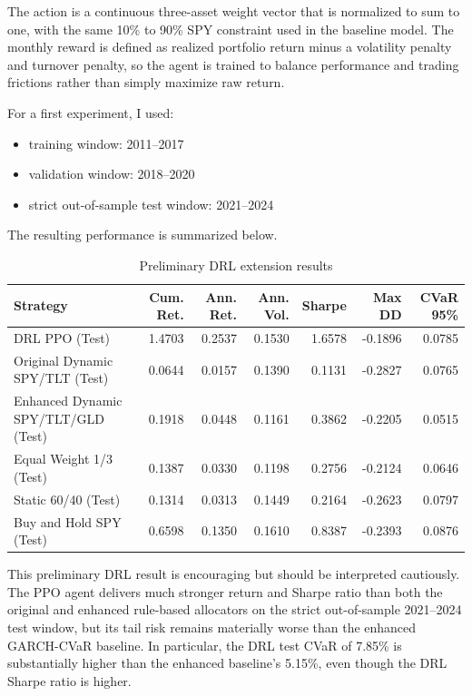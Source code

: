 \documentclass[11pt]{article}
\begin{document}
The action is a continuous three-asset weight vector that is normalized to sum to one, with the same 10\% to 90\% SPY constraint used in the baseline model. The monthly reward is defined as realized portfolio return minus a volatility penalty and turnover penalty, so the agent is trained to balance performance and trading frictions rather than simply maximize raw return.

For a first experiment, I used:
\begin{itemize}
    \item training window: 2011--2017
    \item validation window: 2018--2020
    \item strict out-of-sample test window: 2021--2024
\end{itemize}

The resulting performance is summarized below.

\begin{table}[H]
\centering
\caption{Preliminary DRL extension results}
\small
\begin{tabular}{>{\raggedright\arraybackslash}p{4.6cm}rrrrrr}
\toprule
Strategy & Cum. Ret. & Ann. Ret. & Ann. Vol. & Sharpe & Max DD & CVaR 95\% \\
\midrule
DRL PPO (Test) & 1.4703 & 0.2537 & 0.1530 & 1.6578 & -0.1896 & 0.0785 \\
Original Dynamic SPY/TLT (Test) & 0.0644 & 0.0157 & 0.1390 & 0.1131 & -0.2827 & 0.0765 \\
Enhanced Dynamic SPY/TLT/GLD (Test) & 0.1918 & 0.0448 & 0.1161 & 0.3862 & -0.2205 & 0.0515 \\
Equal Weight 1/3 (Test) & 0.1387 & 0.0330 & 0.1198 & 0.2756 & -0.2124 & 0.0646 \\
Static 60/40 (Test) & 0.1314 & 0.0313 & 0.1449 & 0.2164 & -0.2623 & 0.0797 \\
Buy and Hold SPY (Test) & 0.6598 & 0.1350 & 0.1610 & 0.8387 & -0.2393 & 0.0876 \\
\bottomrule
\end{tabular}
\end{table}

This preliminary DRL result is encouraging but should be interpreted cautiously. The PPO agent delivers much stronger return and Sharpe ratio than both the original and enhanced rule-based allocators on the strict out-of-sample 2021--2024 test window, but its tail risk remains materially worse than the enhanced GARCH-CVaR baseline. In particular, the DRL test CVaR of 7.85\% is substantially higher than the enhanced baseline's 5.15\%, even though the DRL Sharpe ratio is higher.
\end{document}
